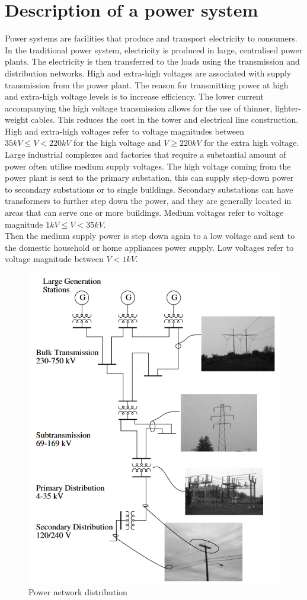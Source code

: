\section{Description of a power system}
Power systems are facilities that produce and transport electricity to consumers. \\
In the traditional power system, electricity is produced in large, centralised power plants. The electricity is then transferred to the loads using the transmission and distribution networks. High and extra-high voltages are associated with supply transmission from the power plant. The reason for transmitting power at high and extra-high voltage levels is to increase efficiency. The lower current accompanying the high voltage transmission allows for the use of thinner, lighter-weight cables. This reduces the cost in the tower and electrical line construction. High and extra-high voltages refer to voltage magnitudes between $35 kV \leq V < 220 kV$ for the high voltage and $V \geq 220 kV$ for the extra high voltage. \\
Large industrial complexes and factories that require a substantial amount of power often utilise medium supply voltages. The high voltage coming from the power plant is sent to the primary substation, this can supply step-down power to secondary substations or to single buildings. Secondary substations can have transformers to further step down the power, and they are generally located in areas that can serve one or more buildings. Medium voltages refer to voltage magnitude $1 kV \leq V < 35 kV$. \\
Then the medium supply power is step down again to a low voltage and sent to the domestic household or home appliances power supply. Low voltages refer to voltage magnitude between $V < 1 kV$. \\
\begin{figure}[H]
\centering
    \includegraphics[width=.5\linewidth]{images/DN/DN.PNG}
\caption[Power network distribution]{Power network distribution \cite{EPD}}
\end{figure}


